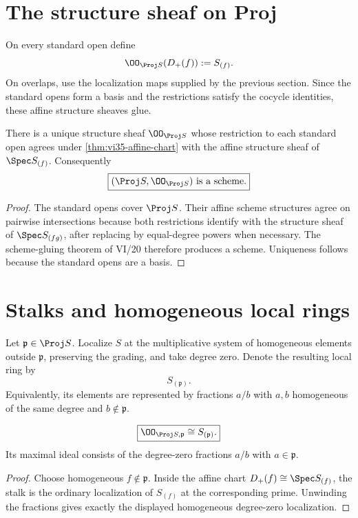 \section{The structure sheaf on Proj}
On every standard open define
\[
\OO_{\Proj S}(D_+(f)):=S_{(f)}.
\]
On overlaps, use the localization maps supplied by the previous section.  Since the standard opens form a basis and the restrictions satisfy the cocycle identities, these affine structure sheaves glue.

\begin{theorem}\label{thm:vi35-proj-scheme}
There is a unique structure sheaf \(\OO_{\Proj S}\) whose restriction to each standard open agrees under \cref{thm:vi35-affine-chart} with the affine structure sheaf of \(\Spec S_{(f)}\).  Consequently
\[
\boxed{(\Proj S,\OO_{\Proj S})\text{ is a scheme}.}
\]
\end{theorem}

\begin{proof}
The standard opens cover \(\Proj S\).  Their affine scheme structures agree on pairwise intersections because both restrictions identify with the structure sheaf of \(\Spec S_{(fg)}\), after replacing by equal-degree powers when necessary.  The scheme-gluing theorem of VI/20 therefore produces a scheme.  Uniqueness follows because the standard opens are a basis.
\end{proof}



\section{Stalks and homogeneous local rings}
Let \(\mathfrak p\in\Proj S\).  Localize \(S\) at the multiplicative system of homogeneous elements outside \(\mathfrak p\), preserving the grading, and take degree zero.  Denote the resulting local ring by
\[
S_{(\mathfrak p)}.
\]
Equivalently, its elements are represented by fractions \(a/b\) with \(a,b\) homogeneous of the same degree and \(b\notin\mathfrak p\).

\begin{proposition}\label{prop:vi35-stalk}
\[
\boxed{\OO_{\Proj S,\mathfrak p}\cong S_{(\mathfrak p)}.}
\]
Its maximal ideal consists of the degree-zero fractions \(a/b\) with \(a\in\mathfrak p\).
\end{proposition}

\begin{proof}
Choose homogeneous \(f\notin\mathfrak p\).  Inside the affine chart \(D_+(f)\cong\Spec S_{(f)}\), the stalk is the ordinary localization of \(S_{(f)}\) at the corresponding prime.  Unwinding the fractions gives exactly the displayed homogeneous degree-zero localization.
\end{proof}

